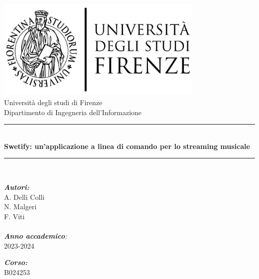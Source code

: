 \documentclass{article}
\begin{document}
  \begin{titlepage}
    \begin{center}
      \vspace*{1cm}
      \includegraphics[width=10cm]{unifi.jpg} \\
      \vspace{1cm}
      \LARGE Università degli studi di Firenze \\
      \vspace{0.4cm}
      \LARGE Dipartimento di Ingegneria dell'Informazione \\
      \rule{17cm}{1.5pt} \\
      \vspace{0.4cm}
      \LARGE \textbf{Swetify: un'applicazione a linea di comando per lo streaming musicale} \\
      \rule{17cm}{1.5pt} \\
      \vspace{1cm}
      \begin{adjustwidth}{1cm}{}
        \begin{flushleft}
          \begin{minipage}[t]{0.45\textwidth}
            \large \textit{\textbf{Autori:}} \\
            A. Delli Colli \\
            N. Malgeri \\
            F. Viti \\
            \hspace{-0.2cm} \\
            \large \textit{\textbf{Anno accademico}:} \\
            2023-2024
          \end{minipage}
          \begin{minipage}[t]{0.45\textwidth}
            \hspace*{1cm}
            \large \textit{\textbf{Corso:}} \\
            \hspace*{1.1cm} B024253 \\

\end{minipage}
\end{flushleft}
\end{adjustwidth}
\end{center}
\end{titlepage}
\end{document}
